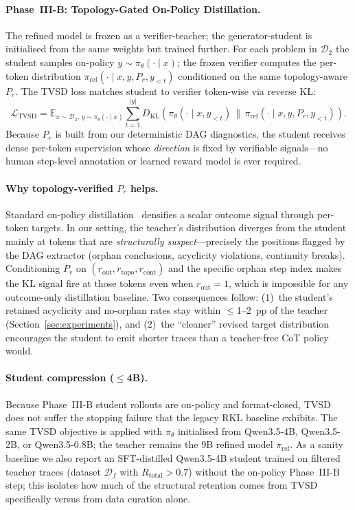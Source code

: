 \paragraph{Phase~III-B: Topology-Gated On-Policy Distillation.}
The refined model is frozen as a verifier-teacher; the generator-student is
initialised from the same weights but trained further. For each problem in
$\mathcal{D}_2$ the student samples on-policy
$y\!\sim\!\pi_\theta(\cdot\mid x)$; the frozen verifier computes the
per-token distribution
$\pi_{\mathrm{ref}}(\cdot\mid x,y,P_r,y_{<t})$ conditioned on the same
topology-aware $P_r$. The TVSD loss matches student to verifier token-wise
via reverse KL:
\begin{equation}
\label{eq:tvsd}
\mathcal{L}_{\mathrm{TVSD}} =
\mathbb{E}_{x\sim\mathcal{D}_2,\,y\sim\pi_\theta(\cdot\mid x)}
\sum_{t=1}^{|y|}
D_{\mathrm{KL}}\!\left(
\pi_\theta(\cdot\mid x,y_{<t})\,\bigg\|\,
\pi_{\mathrm{ref}}(\cdot\mid x,y,P_r,y_{<t})
\right).
\end{equation}
Because $P_r$ is built from our deterministic DAG diagnostics, the student
receives dense per-token supervision whose \emph{direction} is fixed by
verifiable signals---no human step-level annotation or learned reward model
is ever required.

\paragraph{Why topology-verified $P_r$ helps.}
Standard on-policy distillation~\citep{agarwal2024gkd} densifies a scalar
outcome signal through per-token targets. In our setting, the teacher's
distribution diverges from the student mainly at tokens that are
\emph{structurally suspect}---precisely the positions flagged by the DAG
extractor (orphan conclusions, acyclicity violations, continuity breaks).
Conditioning $P_r$ on $(r_{\mathrm{out}},r_{\mathrm{topo}},r_{\mathrm{cont}})$
and the specific orphan step index makes the KL signal fire at those tokens
even when $r_{\mathrm{out}}{=}1$, which is impossible for any outcome-only
distillation baseline. Two consequences follow:
(1)~the student's retained acyclicity and no-orphan rates stay within
$\leq$1--2~pp of the teacher (Section~\ref{sec:experiments}), and
(2)~the ``cleaner'' revised target distribution encourages the student to
emit shorter traces than a teacher-free CoT policy would.

\paragraph{Student compression ($\leq$4B).}
Because Phase~III-B student rollouts are on-policy and format-closed, TVSD
does not suffer the stopping failure that the legacy RKL baseline exhibits.
The same TVSD objective is applied with $\pi_\theta$ initialised from
Qwen3.5-4B, Qwen3.5-2B, or Qwen3.5-0.8B; the teacher remains the 9B refined
model $\pi_{\mathrm{ref}}$. As a sanity baseline we also report an
SFT-distilled Qwen3.5-4B student trained on filtered teacher traces
(dataset $\mathcal{D}_f$ with $R_{\mathrm{total}}>0.7$) without the on-policy
Phase~III-B step; this isolates how much of the structural retention comes
from TVSD specifically versus from data curation alone.

